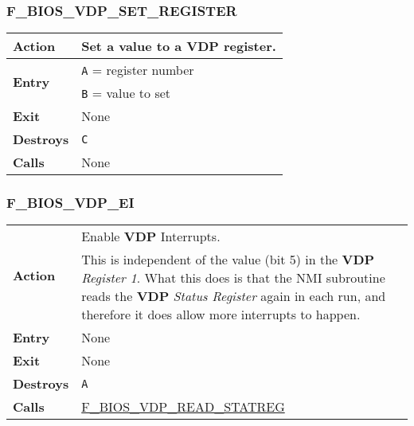         \subsubsection{F\_BIOS\_VDP\_SET\_REGISTER}
        \label{func:fbiosvdpsetregister}
        \begin{tabular}{l p{9cm}}
            \hline\textbf{Action}
            & Set a value to a \textbf{VDP} register. \\
            \hline\multirow[t]{2}{4em}{\textbf{Entry}}
            & \texttt{A} = register number\\
            & \texttt{B} = value to set\\
            \hline\textbf{Exit} & None\\
            \hline\textbf{Destroys} & \texttt{C} \\
            \hline\textbf{Calls} & None\\
            \hline
        \end{tabular}

        \subsubsection{F\_BIOS\_VDP\_EI}
        \label{func:fbiosvdpei}
        \begin{tabular}{l p{9cm}}
            \hline\multirow[t]{2}{4em}{\textbf{Action}}& Enable \textbf{VDP}
            Interrupts.\\
            & This is independent of the value (bit 5) in the \textbf{VDP}
            \textit{Register 1}. What this does is that the NMI subroutine reads
            the \textbf{VDP} \textit{Status Register} again in each run, and
            therefore it does allow more interrupts to happen.\\
            \hline\textbf{Entry} & None\\
            \hline\textbf{Exit} & None\\
            \hline\textbf{Destroys} & \texttt{A}\\
            \hline\textbf{Calls} & \hyperref[func:fbiosvdpreadstatreg]
            {F\_BIOS\_VDP\_READ\_STATREG}\\
            \hline
        \end{tabular}


